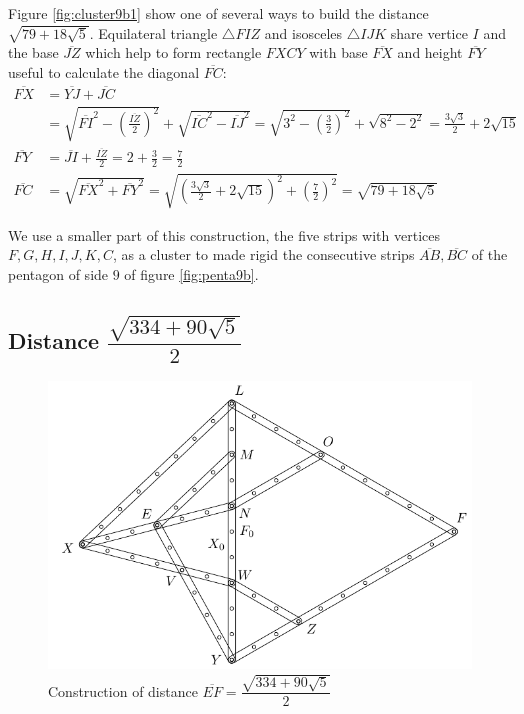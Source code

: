 \documentclass[11pt]{article}
\begin{document}
Figure \ref{fig:cluster9b1} show one of several ways to build the distance $\sqrt{79 + 18\sqrt5}$. 
Equilateral triangle $\triangle{FIZ}$ and isosceles $\triangle{IJK}$ share vertice $I$ and the base $\overline{JZ}$ which help to form rectangle $FXCY$ with base $\overline{FX}$ and height $\overline{FY}$ useful to calculate the diagonal $\overline{FC}$:
\begin{align}
\overline{FX} &= \overline{YJ} + \overline{JC}\nonumber\\
 &= \sqrt{\overline{FI}^2 - \left(\frac{\overline{IZ}}2\right)^2}
  + \sqrt{\overline{IC}^2 - \overline{IJ}^2}
  = \sqrt{3^2 - \left(\frac{3}2\right)^2} + \sqrt{8^2 - 2^2} 
  = \frac{3\sqrt3}2 + 2\sqrt{15} \nonumber\\
\overline{FY} &= \overline{JI} + \frac{\overline{IZ}}2
  = 2 + \frac{3}2 = \frac{7}2 \nonumber\\
\overline{FC} &= \sqrt{\overline{FX}^2 + \overline{FY}^2}
 = \sqrt{\left(\frac{3\sqrt3}2 + 2\sqrt{15}\right)^2 + \left(\frac{7}2\right)^2}
 = \sqrt{79 + 18\sqrt5}
\end{align}

We use a smaller part of this construction, the five strips with vertices $F,G,H,I,J,K,C$, as a cluster to made rigid the consecutive strips $\overline{AB},\overline{BC}$ of the pentagon of side $9$ of figure \ref{fig:penta9b}.


\subsection{Distance $\dfrac{\sqrt{334 + 90\sqrt5}}2$}

\begin{figure}[H]
\centering
\includegraphics[scale=1]{9/cluster9b2}
\caption{Construction of distance $\overline{EF}=\dfrac{\sqrt{334 + 90\sqrt5}}2$}
\label{fig:cluster9b2}
\end{figure}
\end{document}
